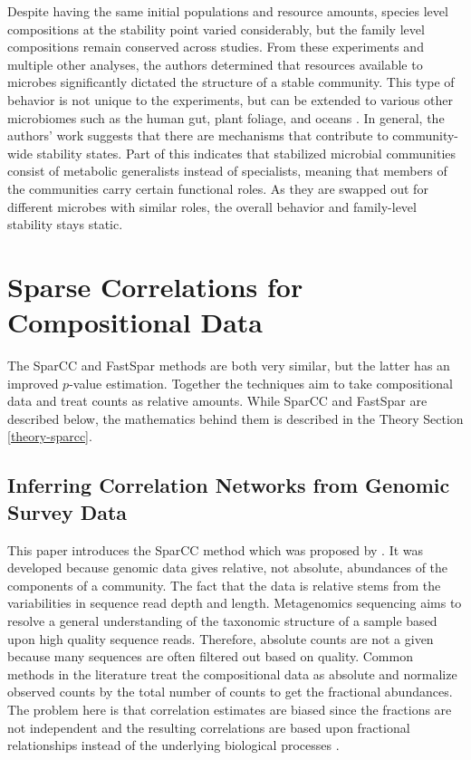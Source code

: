 Despite having the same initial populations and resource amounts, species level compositions at the stability point varied considerably, but the family level compositions remain conserved across studies. From these experiments and multiple other analyses, the authors determined that resources available to microbes significantly dictated the structure of a stable community. This type of behavior is not unique to the experiments, but can be extended to various other microbiomes such as the human gut, plant foliage, and oceans \citep{Goldford2018}. In general, the authors' work suggests that there are mechanisms that contribute to community-wide stability states. Part of this indicates that stabilized microbial communities consist of metabolic generalists instead of specialists, meaning that members of the communities carry certain functional roles. As they are swapped out for different microbes with similar roles, the overall behavior and family-level stability stays static.


\section{Sparse Correlations for Compositional Data}\label{lit-fastcc}

The \acrfull{SparCC} and \acrfull{FastSpar} methods are both very similar, but the latter has an improved $p$-value estimation. Together the techniques aim to take compositional data and treat counts as relative amounts. While \acrshort{SparCC} and \acrshort{FastSpar} are described below, the mathematics behind them is described in the Theory Section \ref{theory-sparcc}.

\subsection{Inferring Correlation Networks from Genomic Survey Data} \label{lit-sparcc}
This paper introduces the \acrshort{SparCC} method which was proposed by \citet{Friedman2012}. It was developed because genomic data gives relative, not absolute, abundances of the components of a community. The fact that the data is relative stems from the variabilities in sequence read depth and length. Metagenomics sequencing aims to resolve a general understanding of the taxonomic structure of a sample based upon high quality sequence reads. Therefore, absolute counts are not a given because many sequences are often filtered out based on quality. Common methods in the literature treat the compositional data as absolute and normalize observed counts by the total number of counts to get the fractional abundances. The problem here is that correlation estimates are biased since the fractions are not independent \citep{Buccianti2006} and the resulting correlations are based upon fractional relationships instead of the underlying biological processes \citep{Aitchison2003a,Friedman2012}.

